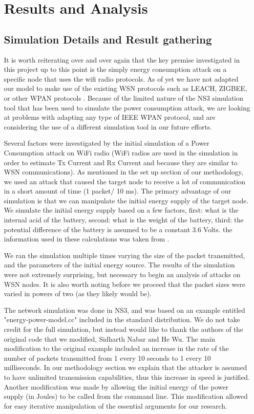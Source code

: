 \section{Results and Analysis}

\subsection{Simulation Details and Result gathering}
It is worth reiterating over and over again that the key premise investigated in this project up to this point is the simply 
energy consumption attack on a specific node that uses the wifi radio protocols. As of yet we have not adapted our model to 
make use of the existing WSN protocols such as LEACH, ZIGBEE, or other WPAN protocols \cite{BarontibPillaiaEtAl07comcom}\cite{1700009}. Because of the 
limited nature of the NS3 simulation tool that has been used to simulate the power consumption attack, we are looking at 
problems with adapting any type of IEEE WPAN protocol, and are considering the use of a different simulation tool in our future efforts. 


Several factors were investigated by the initial simulation of a Power Consumption attack on WiFi radio 
(WiFi radios are used in the simulation in order to estimate Tx Current and Rx Current and because they are similar to WSN communications).
As mentioned in the set up section of our methodology, we used an attack that caused the target node to receive a lot of communication 
in a short amount of time (1 packet/ 10 ms). The primary advantage of our simulation is that we can manipulate the initial energy 
supply of the target node. We simulate the initial energy supply based on a few factors, first: what is the internal acid of the 
battery, second: what is the weight of the battery, third: the potential difference of the battery is assumed to be a constant 3.6 Volts. 
the information used in these calculations was taken from \cite{Doe:2009:Misc}.

We ran the simulation multiple times varying the size of the packet transmitted, and the parameters of the initial energy source. The 
results of the simulation were not extremely surprising, but necessary to begin an analysis of attacks on WSN nodes. It is also worth
noting before we proceed that the packet sizes were varied in powers of two (as they likely would be). 

The network simulation was done in NS3, and was based on an example entitled "energy-power-model.cc" included in the standard distribution.
We do not take credit for the full simulation, but instead would like to thank the authors of the original code that we modified, 
Sidharth Nabar and He Wu. The main modification to the original example included an increase in the rate of the number of packets 
transmitted from 1 every 10 seconds to 1 every 10 milliseconds. In our methodology section we explain that the attacker is assumed to have
unlimited transmission capabilities, thus this increase in speed is justified. Another modification was made by allowing the initial energy
of the power supply (in Joules) to be called from the command line. This modification allowed for easy iterative manipulation of the 
essential arguments for our research. 

